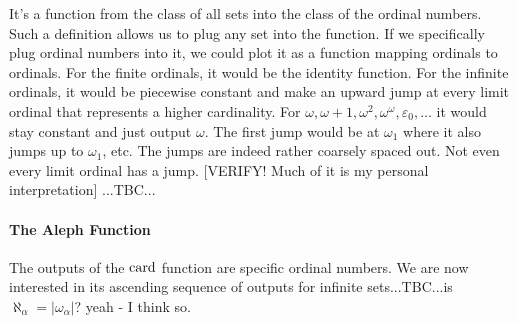It's a function from the class of all sets into the class of the ordinal numbers. Such a definition allows us to plug any set into the function. If we specifically plug ordinal numbers into it, we could plot it as a function mapping ordinals to ordinals. For the finite ordinals, it would be the identity function. For the infinite ordinals, it would be piecewise constant and make an upward jump at every limit ordinal that represents a higher cardinality. For $\omega, \omega+1, \omega^2, \omega^\omega, \varepsilon_0, \ldots$ it would stay constant and just output $\omega$. The first jump would be at $\omega_1$ where it also jumps up to $\omega_1$, etc. The jumps are indeed rather coarsely spaced out. Not even every limit ordinal has a jump. [VERIFY! Much of it is my personal interpretation] ...TBC...



\paragraph{The Aleph Function} 
The outputs of the $\operatorname{card}$ function are specific ordinal numbers. We are now interested in its ascending sequence of outputs for infinite sets...TBC...is $\aleph_{\alpha} = |\omega_{\alpha}|$? yeah - I think so.





